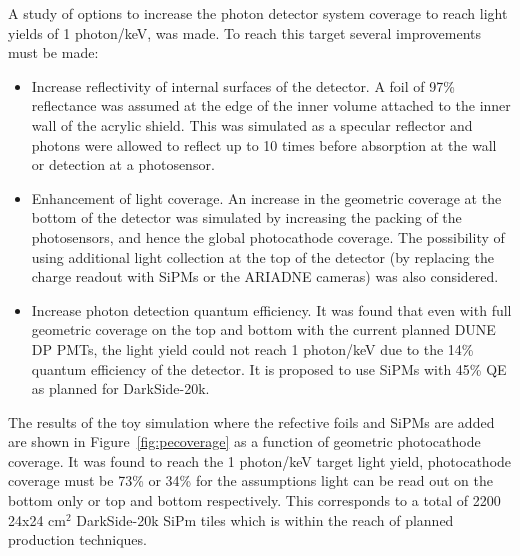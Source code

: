 \documentclass[a4paper,11pt]{article}
\begin{document}
A study of options to increase the photon detector system coverage to reach light yields of 1 photon/keV, was made. To reach this target several improvements must be made:
\begin{itemize}
    \item Increase reflectivity of internal surfaces of the detector. A foil of 97\% reflectance was assumed at the edge of the inner volume attached to the inner wall of the acrylic shield. This was simulated as a specular reflector and photons were allowed to reflect up to 10 times before absorption at the wall or detection at a photosensor.
    \item Enhancement of light coverage. An increase in the geometric coverage at the bottom of the detector was simulated by increasing the packing of the photosensors, and hence the global photocathode coverage. The possibility of using additional light collection at the top of the detector (by replacing the charge readout with SiPMs or the ARIADNE cameras) was also considered.
    \item Increase photon detection quantum efficiency. It was found that even with full geometric coverage on the top and bottom with the current planned DUNE DP PMTs, the light yield could not reach 1 photon/keV due to the 14\% quantum efficiency of the detector. It is proposed to use SiPMs with 45\% QE as planned for DarkSide-20k.
\end{itemize}

The results of the toy simulation where the refective foils and SiPMs are added are shown in Figure~\ref{fig:pecoverage} as a function of geometric photocathode coverage. It was found to reach the 1 photon/keV target light yield, photocathode coverage must be 73\% or 34\% for the assumptions light can be read out on the bottom only or top and bottom respectively. This corresponds to a total of 2200 24x24 cm$^{2}$ DarkSide-20k SiPm tiles which is within the reach of planned production techniques.
\end{document}
